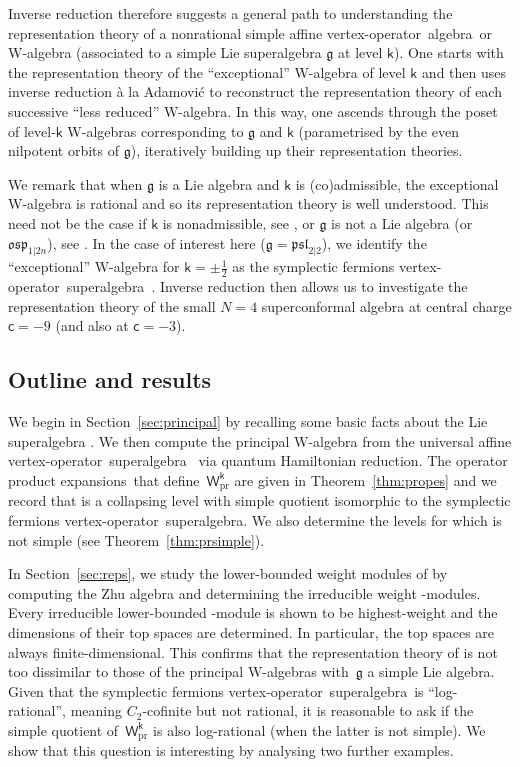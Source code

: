 \documentclass[pdftex]{sigma}
\numberwithin{equation}{section}
\newcommand{\cc}{\mathsf{c}} %
\newcommand{\kk}{\mathsf{k}} %
\newcommand{\alg}[1]{\mathfrak{#1}} %
\newcommand{\VOA}[1]{\mathsf{#1}} %
\newcommand{\SLSA}[3]{\alg{#1}_{#2 \vert #3}} %
\newcommand{\psl}{\SLSA{psl}{2}{2}}
\newcommand{\uaff}[2]{\VOA{V}^{#1}(#2)} %
\newcommand{\upsl}[1][\kk]{\uaff{#1}{\psl}} %
\newcommand{\uwalg}[2]{\VOA{W}^{#1}_{\mathrm{#2}}} %
\newcommand{\upr}[1][\kk]{\uwalg{#1}{pr}} %
\newcommand{\fdim}{finite-dimensional}
\newcommand{\vo}{vertex-operator}
\newcommand{\voa}{\vo\ algebra}
\newcommand{\svoa}{\vo\ superalgebra}
\newcommand{\ope}{operator product expansion}
\newcommand{\opes}{\ope s}
\begin{document}
Inverse reduction therefore suggests a general path to understanding the representation theory of a nonrational simple affine \voa\ or W-algebra (associated to a simple Lie superalgebra $\alg{g}$ at level $\kk$).
One starts with the representation theory of the ``exceptional'' W-algebra of level $\kk$ \cite{AraRat19} and then uses inverse reduction \`{a} la Adamovi\'{c} to reconstruct the representation theory of each successive ``less reduced'' W-algebra.
In this way, one ascends through the poset of level-$\kk$ W-algebras corresponding to $\alg{g}$ and $\kk$ (parametrised by the even nilpotent orbits of $\alg{g}$), iteratively building up their representation theories.

We remark that when $\alg{g}$ is a Lie algebra and $\kk$ is (co)admissible, the exceptional W-algebra is rational \cite{AraRat19} and so its representation theory is well understood.
This need not be the case if $\kk$ is nonadmissible, see \cite[Section~5.2]{AdaWei23}, or $\alg{g}$ is not a Lie algebra (or $\SLSA{osp}{1}{2n}$), see \cite{CreSL225}.
In the case of interest here ($\alg{g} = \psl$), we identify the ``exceptional'' W-algebra for $\kk = \pm \frac{1}{2}$ as the symplectic fermions \svoa\ \cite{KauSym00}.
Inverse reduction then allows us to investigate the representation theory of the small $N=4$ superconformal algebra at central charge $\cc=-9$ (and also at $\cc=-3$).

\subsection{Outline and results}

We begin in Section~\ref{sec:principal} by recalling some basic facts about the Lie superalgebra \smash{$\psl$}.
We then compute the principal W-algebra \smash{$\upr$} from the universal affine \vo\ superalgebra~\smash{$\upsl$} via quantum Hamiltonian reduction.
The \opes\ that define~$\upr$ are given in Theorem~\ref{thm:propes} and we record that \smash{$\kk=\pm\frac{1}{2}$} is a collapsing level with simple quotient isomorphic to the symplectic fermions \svoa.
We also determine the levels for which \smash{$\upr$} is not simple (see Theorem~\ref{thm:prsimple}).

In Section~\ref{sec:reps}, we study the lower-bounded weight modules of \smash{$\upr$} by computing the Zhu algebra \smash{$\zhu{\upr}$} and determining the irreducible weight \smash{$\zhu{\upr}$}-modules.
Every irreducible lower-bounded \smash{$\upr$}-module is shown to be highest-weight and the dimensions of their top spaces are determined.
In particular, the top spaces are always \fdim.
This confirms that the representation theory of \smash{$\upr$} is not too dissimilar to those of the principal W-algebras with~$\alg{g}$ a simple Lie algebra.
Given that the symplectic fermions \svoa\ is ``log-rational'', meaning $C_2$-cofinite but not rational, it is reasonable to ask if the simple quotient of~$\upr$ is also log-rational (when the latter is not simple).
We show that this question is interesting by analysing two further examples.
\end{document}
